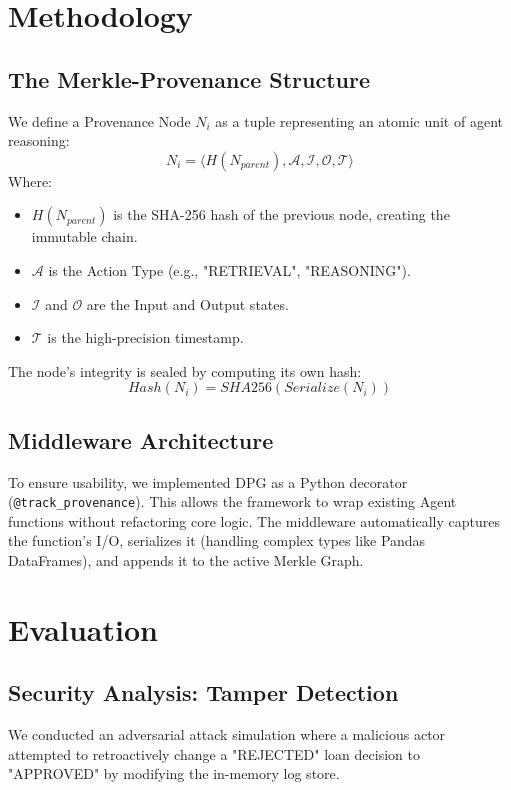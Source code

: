 \documentclass[twocolumn]{article}
\begin{document}
\section{Methodology}

\subsection{The Merkle-Provenance Structure}
We define a Provenance Node $N_i$ as a tuple representing an atomic unit of agent reasoning:
\begin{equation}
    N_i = \langle H(N_{parent}), \mathcal{A}, \mathcal{I}, \mathcal{O}, \mathcal{T} \rangle
\end{equation}
Where:
\begin{itemize}
    \item $H(N_{parent})$ is the SHA-256 hash of the previous node, creating the immutable chain.
    \item $\mathcal{A}$ is the Action Type (e.g., "RETRIEVAL", "REASONING").
    \item $\mathcal{I}$ and $\mathcal{O}$ are the Input and Output states.
    \item $\mathcal{T}$ is the high-precision timestamp.
\end{itemize}

The node's integrity is sealed by computing its own hash:
\begin{equation}
    Hash(N_i) = SHA256( Serialize(N_i) )
\end{equation}

\subsection{Middleware Architecture}
To ensure usability, we implemented DPG as a Python decorator (\texttt{@track\_provenance}). This allows the framework to wrap existing Agent functions without refactoring core logic. The middleware automatically captures the function's I/O, serializes it (handling complex types like Pandas DataFrames), and appends it to the active Merkle Graph.

\section{Evaluation}

\subsection{Security Analysis: Tamper Detection}
We conducted an adversarial attack simulation where a malicious actor attempted to retroactively change a "REJECTED" loan decision to "APPROVED" by modifying the in-memory log store.
\end{document}
